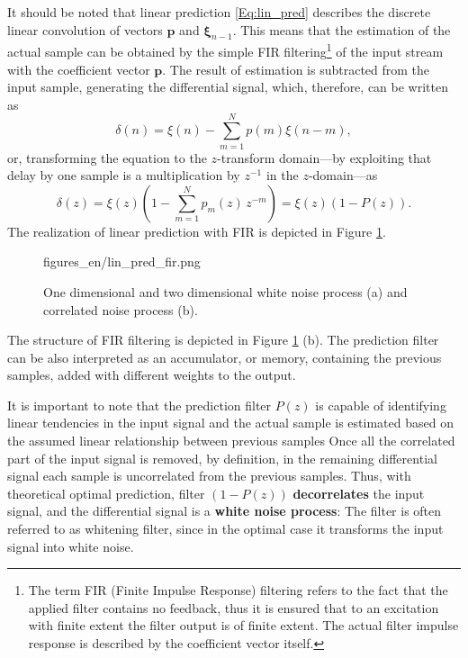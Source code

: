 It should be noted that linear prediction \eqref{Eq:lin_pred} describes the discrete linear convolution of vectors $\mathbf{p}$ and $\mathbf{\xi}_{n-1}$. 
This means that the estimation of the actual sample can be obtained by the simple FIR filtering\footnote{The term FIR (Finite Impulse Response) filtering refers to the fact that the applied filter contains no feedback, thus it is ensured that to an excitation with finite extent the filter output is of finite extent.
The actual filter impulse response is described by the coefficient vector itself.} of the input stream with the coefficient vector $\mathbf{p}$.
The result of estimation is subtracted from the input sample, generating the differential signal, which, therefore, can be written as
\begin{equation}
\delta(n) = \xi(n) - \sum_{m=1}^{N} p(m) \xi(n-m),
\end{equation}
or, transforming the equation to the $z$-transform domain---by exploiting that delay by one sample is a multiplication by $z^{-1}$ in the $z$-domain---as
\begin{equation}
\delta(z) = \xi(z)\left( 1  - \sum_{m=1}^{N} p_m(z) \, z^{-m}\right) = \xi(z)\left( 1 - P(z) \right).
\label{Eq:lin_pred_filter}
\end{equation}
The realization of linear prediction with FIR is depicted in Figure \ref{Fig:FIR_prediction}.
\begin{figure}[]
	\centering
	\begin{overpic}[width = 1\columnwidth ]{figures_en/lin_pred_fir.png}
	\small
	\end{overpic}
	\caption{One dimensional and two dimensional white noise process (a) and correlated noise process (b).}
	\label{Fig:FIR_prediction}
\end{figure}
The structure of FIR filtering is depicted in Figure \ref{Fig:FIR_prediction} (b).
The prediction filter can be also interpreted as an accumulator, or memory, containing the previous samples, added with different weights to the output.

\vspace{3mm}
It is important to note that the prediction filter $P(z)$ is capable of identifying linear tendencies in the input signal and the actual sample is estimated based on the assumed linear relationship between previous samples
Once all the correlated part of the input signal is removed, by definition, in the remaining differential signal each sample is uncorrelated from the previous samples.
Thus, with theoretical optimal prediction, filter $\left( 1  -  P(z) \right)$ \textbf{decorrelates} the input signal, and the differential signal is a \textbf{white noise process}:
The filter is often referred to as whitening filter, since in the optimal case it transforms the input signal into white noise. 



